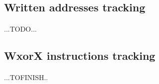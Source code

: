 \subsection{Written addresses tracking}
\paragraph{}
...TODO...



\subsection{WxorX instructions tracking}
\paragraph{}
...TOFINISH..

